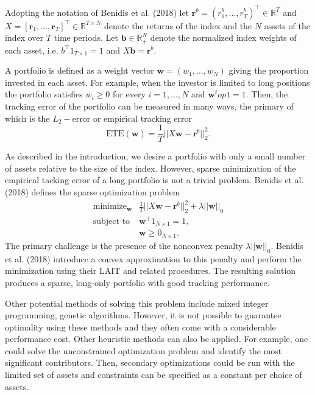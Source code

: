 \documentclass[a4paper, 12pt]{article}
\theoremstyle{plain}
\theoremstyle{definition}
\theoremstyle{remark}
\begin{document}
Adopting the notation of Benidis et al. (2018) let $\textbf{r}^b = (r_1^b,...,r_T^b)^\top \in \mathbb{R}^T$ and $X = [\textbf{r}_1,...,\textbf{r}_T]^\top \in \mathbb{R}^{T\times N}$ denote the returns of the index and the $N$ assets of the index over $T$ time periods.  Let $\textbf{b}\in\mathbb{R}_+^N$ denote the normalized index weights of each asset, i.e. $b^\top 1_{T\times 1} = 1$ and $X\textbf{b} = \textbf{r}^b$.  

A portfolio is defined as a weight vector $\textbf{w} = (w_1, ..., w_N)$ giving the proportion invested in each asset.  For example, when the investor is limited to long positions the portfolio satisfies $w_i \geq 0$ for every $i = 1, ..., N$ and $\textbf{w}^top 1 = 1$.  Then, the tracking error of the portfolio can be measured in many ways, the primary of which is the $L_2-$error or empirical tracking error
\[\text{ETE}(\textbf{w})=\frac{1}{T}||X\textbf{w}-\textbf{r}^b||_2^2.\]

As described in the introduction, we desire a portfolio with only a small number of assets relative to the size of the index.  However, sparse minimization of the empirical tacking error of a long portfolio is not a trivial problem. Benidis et al. (2018) defines the sparse optimization problem
\begin{align}
\text{minimize}_{\textbf{w}}& \frac{1}{T}||X\textbf{w}-\textbf{r}^b||_2^2 + \lambda||\textbf{w}||_0\nonumber\\
\text{subject to}& \textbf{w}^\top 1_{N\times 1}=1, \nonumber \\
 & \textbf{w}\geq 0_{N\times 1}.
\end{align} 
The primary challenge is the presence of the nonconvex penalty $\lambda||\textbf{w}||_0$.  Benidis et al. (2018) introduce a convex approximation to this penalty and perform the minimization using their LAIT and related procedures.  The resulting solution produces a sparse, long-only portfolio with good tracking performance.

Other potential methods of solving this problem include mixed integer programming, genetic algorithms. However, it is not possible to guarantee optimality using these methods and they often come with a considerable performance cost. Other heuristic methods can also be applied. For example, one could solve the unconstrained optimization problem and identify the most significant contributors. Then, secondary optimizations could be run with the limited set of assets and constraints can be specified as a constant per choice of assets.
\end{document}
